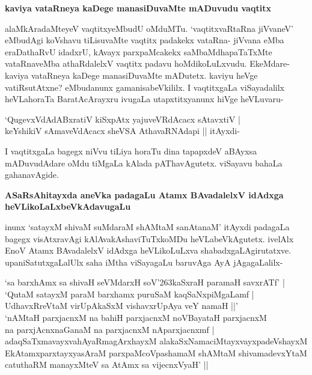 {\bigskip
\noindent
{\large\bf kaviya vataRneya kaDege manasiDuvaMte mADuvudu vaqtitx}}\label{page245}
\medskip

\noindent
alaMkAradaMteyeV vaqtitxyeMbudU oMduMTu. `vaqtitxvaRtaRna jiVvaneV' eMbudAgi koVshavu tiLisuvaMte vaqtitx padakekx vataRna- jiVvana eMba eraDathaRvU idadxrU, kAvayx parxpaMcakekx saMbaMdha\-paTaTxMte vataRnaveMba athaRdalelxV vaqtitx padavu hoMdikoLuLxvudu. EkeMdare- kaviya vataRneya kaDege manasiDu\-vaMte mADutetx. kaviyu heVge vatiRsutAtxne? eMbudanunx gamanisabeVkililx. I vaqtitxgaLa viSaya\-dalilx heVLahoraTa BaratAcArayxru ivugaLa utapxtitxyanunx hiVge heVLuvaru-

\begin{shloka}
`QugevxVdAdABxratiV kiSxpAtx yajuveVRdAcacx sAtavxtiV |\\\label{245}
keYshikiV sAmaveVdAcacx sheVSA AthavaRNAdapi || itAyxdi-
\end{shloka}

I vaqtitxgaLa bagegx niVvu tiLiya horaTu dina tapapxdeV aBAyxsa mADuvudAdare oMdu tiMgaLa kAlada pAThavAgutetx. viSayavu bahaLa gahanavAgide.

{\bigskip
\noindent
{\large\bf ASaRsAhitayxda aneVka padagaLu Atamx BAvadalelxV idAdxga heVLikoLaLxbeVkAdavugaLu}}
\medskip

\noindent
inunx `satayxM shivaM suMdaraM shAMtaM sanAtanaM' itAyxdi padagaLa bagegx visAtxravAgi kAlAvakAshaviTuTx\-koMDu heVLabeVkAgutetx. ivelAlx EnoV Atamx BAvadalelxV idAdxga heVLikoLuLxva shabadxgaLAgiru\-tatxve. upa\-niSatutxgaLalUlx saha iMtha viSayagaLu baruvAga AyA jAgagaLalilx-

\begin{shloka}
`sa barxhAmx sa shivaH seVMdarxH soV\char'263kaSxraH paramaH savxrATf' |\\\label{246}
`QutaM satayxM paraM barxhamx puruSaM kaqSaNxpiMgaLamf |\\\label{246}
UdhavxRreVtaM virUpAkaSxM vishavxrUpAya veY namaH ||'\\
`nAMtaH parxjacnxM na bahiH parxjacnxM noVBayataH parxjacnxM \\\label{246}
na parxjAcnxnaGanaM na parxjacnxM nAparxjacnxmf |\\
adaqSaTxmavayxvahAyaRmagArxhayxM alakaSxNamaciMtayxvayxpadeVshayxM \\
EkAtamxparxtayxyasAraM parxpaMcoVpashamaM shAMtaM shivamadevxYtaM \\
catuthaRM manayxMteV sa AtAmx sa vijecnxVyaH' ||
\end{shloka}

